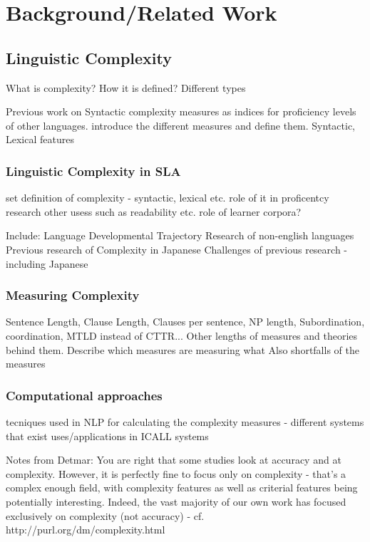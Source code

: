 \chapter{Background/Related Work}

\section{Linguistic Complexity}
What is complexity? How it is defined? Different types

Previous work on Syntactic complexity measures as indices for proficiency levels of other languages.
introduce the different measures and define them.
Syntactic, Lexical features

\subsection{Linguistic Complexity in SLA}
set definition of complexity - syntactic, lexical etc.
role of it in proficentcy research
other usess such as readability etc.
role of learner corpora?

Include:
Language Developmental Trajectory
Research of non-english languages
Previous research of Complexity in Japanese
Challenges of previous research - including Japanese


\subsection{Measuring Complexity}
Sentence Length, Clause Length, Clauses per sentence, NP length, Subordination, coordination, MTLD instead of CTTR...
Other lengths of measures and theories behind them. Describe which measures are measuring what Also shortfalls of the
measures

%

\subsection{Computational approaches}
tecniques used in NLP for calculating the complexity measures - different systems that exist
uses/applications in ICALL systems




Notes from Detmar:
You are right that some studies look at accuracy and at
complexity. However, it is perfectly fine to focus only on complexity
- that's a complex enough field, with complexity features as well as
criterial features being potentially interesting. Indeed, the vast
majority of our own work has focused exclusively on complexity (not
accuracy) - cf. http://purl.org/dm/complexity.html

